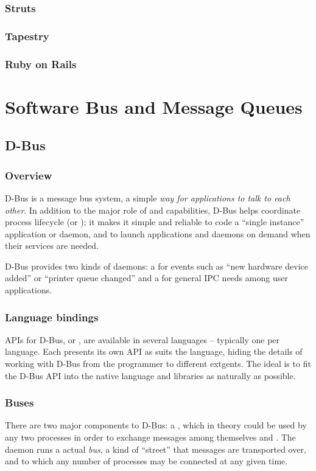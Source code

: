 \documentclass{myproc}
\begin{document}
\subsubsection{Struts}
\subsubsection{Tapestry}
\subsubsection{Ruby on Rails}
\bit
\w 
\eit

\section{Software Bus and Message Queues}
\subsection{D-Bus}
\subsubsection{Overview}
D-Bus is a message bus system, a simple {\em way for applications to talk to
  each other\/}. In addition to the major role of  and  capabilities, D-Bus helps
coordinate process lifecycle (or ); it makes it simple and
reliable to code a ``single instance'' application or daemon, and to launch
applications and daemons on demand when their services are needed.

D-Bus provides two kinds of daemons: a  for events such as
``new hardware device added'' or ``printer queue changed'' and a
 for general IPC needs among user
applications. 


\subsubsection{Language bindings}
APIs for D-Bus, or , are available in several languages --
typically one per language.  Each presents its own API as suits the language,
hiding the details of working with D-Bus from the programmer to different
extgents. The ideal is to fit the D-Bus API into the native language and
libraries as naturally as possible. 

\subsubsection{Buses}
There are two major components to D-Bus: a , which in theory could be used by any two processes in order
to exchange messages among themselves and . 
The daemon runs a actual {\em bus\/}, a kind of ``street'' that messages are
transported over, and to which any number of processes may be connected at any
given time. 
\end{document}
